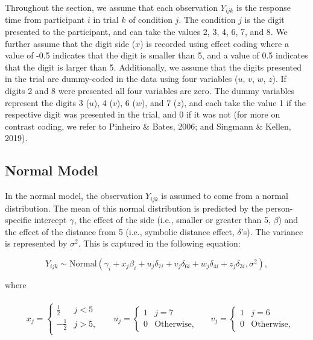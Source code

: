 \documentclass[
  english,
  doc,floatsintext]{apa6}
\begin{document}
Throughout the section, we assume that each observation \(Y_{ijk}\) is the response time from participant \(i\) in trial \(k\) of condition \(j\). The condition \(j\) is the digit presented to the participant, and can take the values 2, 3, 4, 6, 7, and 8. We further assume that the digit side (\(x\)) is recorded using effect coding where a value of -0.5 indicates that the digit is smaller than 5, and a value of 0.5 indicates that the digit is larger than 5. Additionally, we assume that the digits presented in the trial are dummy-coded in the data using four variables (\(u\), \(v\), \(w\), \(z\)). If digits 2 and 8 were presented all four variables are zero. The dummy variables represent the digits 3 (\(u\)), 4 (\(v\)), 6 (\(w\)), and 7 (\(z\)), and each take the value 1 if the respective digit was presented in the trial, and 0 if it was not (for more on contrast coding, we refer to Pinheiro \& Bates, 2006; and Singmann \& Kellen, 2019).

\hypertarget{normal-model}{%
\subsection{Normal Model}\label{normal-model}}

In the normal model, the observation \(Y_{ijk}\) is assumed to come from a normal distribution. The mean of this normal distribution is predicted by the person-specific intercept \(\gamma\), the effect of the side (i.e., smaller or greater than 5, \(\beta\)) and the effect of the distance from 5 (i.e., symbolic distance effect, \(\delta\)'s). The variance is represented by \(\sigma^2\). This is captured in the following equation:

\begin{equation}
Y_{ijk} \sim \text{Normal}(\gamma_{i} + x_j \beta_{i} + u_j \delta_{7i} + v_j \delta_{6 i} + w_j \delta_{4i} + z_j \delta_{3i}, \sigma^2), \label{eq:datalevel}
\end{equation}

where

\begin{align*}
&
\begin{aligned}
x_j = 
\begin{cases}
\frac{1}{2} & j < 5\\
- \frac{1}{2} & j > 5, \\
\end{cases}
\end{aligned}
&
\begin{aligned}
u_j = 
\begin{cases}
1 & j = 7\\
0 & \text{Otherwise},
\end{cases}
\end{aligned}
&
\begin{aligned}
v_j = 
\begin{cases}
1 & j = 6\\
0 & \text{Otherwise},
\end{cases}
\end{aligned}
\end{align*}
\end{document}

